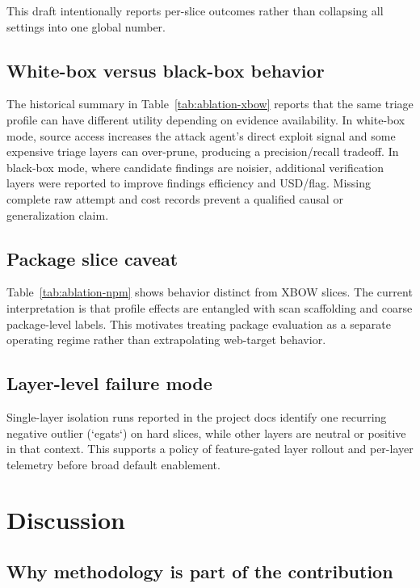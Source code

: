 \documentclass[11pt]{article}
\begin{document}
This draft intentionally reports per-slice outcomes rather than collapsing all
settings into one global number.

\subsection{White-box versus black-box behavior}

The historical summary in Table~\ref{tab:ablation-xbow} reports that the same triage
profile can have different utility depending on evidence availability. In
white-box mode, source access increases the attack agent's direct exploit signal
and some expensive triage layers can over-prune, producing a precision/recall
tradeoff. In black-box mode, where candidate findings are noisier, additional
verification layers were reported to improve findings efficiency and
USD/flag. Missing complete raw attempt and cost records prevent a qualified
causal or generalization claim.

\subsection{Package slice caveat}

Table~\ref{tab:ablation-npm} shows behavior distinct from XBOW slices. The
current interpretation is that profile effects are entangled with scan
scaffolding and coarse package-level labels. This motivates treating package
evaluation as a separate operating regime rather than extrapolating web-target
behavior.

\subsection{Layer-level failure mode}

Single-layer isolation runs reported in the project docs identify one recurring
negative outlier (`egats`) on hard slices, while other layers are neutral or
positive in that context. This supports a policy of feature-gated layer rollout
and per-layer telemetry before broad default enablement.

\section{Discussion}

\subsection{Why methodology is part of the contribution}
\end{document}
